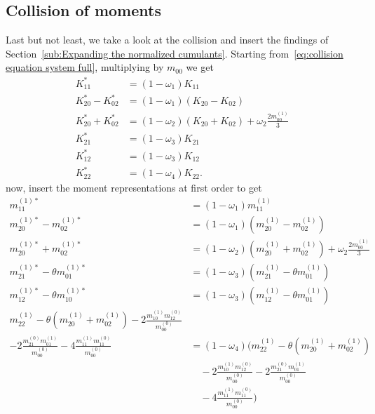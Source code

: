 \subsection{Collision of moments}
\label{sub:Collision of moments}
Last but not least, we take a look at the collision and insert the findings of Section~\ref{sub:Expanding the normalized cumulants}.
Starting from~\eqref{eq:collision equation system full}, multiplying by $m_{00}$ we get
\begin{equation}
  \begin{aligned}
    K_{11}^{*} & = (1-\omega_1)K_{11} \\
    K_{20}^{*} - K_{02}^{*} & = (1-\omega_1) (K_{20} - K_{02}) \\
    K_{20}^{*} + K_{02}^{*} & = (1-\omega_2) (K_{20} + K_{02}) + \omega_2 \frac{2 m_{00}^{(1)}}{3} \\
    K_{21}^{*} & = (1-\omega_3)K_{21} \\
    K_{12}^{*} & = (1-\omega_3)K_{12} \\
    K_{22}^{*} & = (1-\omega_4)K_{22}.
  \end{aligned}
\end{equation}
now, insert the moment representations at first order to get
\begin{equation}
  \begin{aligned}
    m_{11}^{(1)*}
    & = (1-\omega_1)m_{11}^{(1)} \\
%
    m_{20}^{(1)*} - m_{02}^{(1)*}
    & = (1-\omega_1) (m_{20}^{(1)} - m_{02}^{(1)}) \\
%
    m_{20}^{(1)*} + m_{02}^{(1)*}
    & = (1-\omega_2) (m_{20}^{(1)} + m_{02}^{(1)}) + \omega_2 \frac{2 m_{00}^{(1)}}{3} \\
%
    m_{21}^{(1)*} - \theta m_{01}^{(1)*}
    & = (1-\omega_3)(m_{21}^{(1)} - \theta m_{01}^{(1)}) \\
%
    m_{12}^{(1)*} - \theta m_{10}^{(1)*}
    & = (1-\omega_3)(m_{12}^{(1)} - \theta m_{01}^{(1)}) \\
%
m_{22}^{(1)}
  - \theta (m_{20}^{(1)} + m_{02}^{(1)})
  - 2\frac{ m_{10}^{(1)} m_{12}^{(0)} }{m_{00}^{(0)}}&\\
  - 2\frac{ m_{21}^{(0)} m_{01}^{(1)} }{m_{00}^{(0)}}
  - 4\frac{ m_{11}^{(1)} m_{11}^{(0)} }{m_{00}^{(0)}}
    & = (1-\omega_4)\bigg(m_{22}^{(1)}
      - \theta (m_{20}^{(1)} + m_{02}^{(1)})
      \\&\quad
      - 2\frac{ m_{10}^{(1)} m_{12}^{(0)} }{m_{00}^{(0)}}
      - 2\frac{ m_{21}^{(0)} m_{01}^{(1)} }{m_{00}^{(0)}}
      \\&\quad
      - 4\frac{ m_{11}^{(1)} m_{11}^{(0)} }{m_{00}^{(0)}}\bigg) \\
  \end{aligned}
\end{equation}
